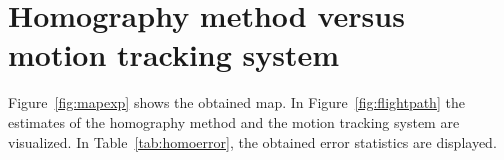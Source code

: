 \section{Homography method versus motion tracking system}
\label{sec:exp:homovsopti}

Figure~\ref{fig:mapexp} shows the obtained map. In Figure~\ref{fig:flightpath} the estimates of the homography method and the motion tracking system are visualized. In Table~\ref{tab:homoerror}, the obtained error statistics are displayed.  